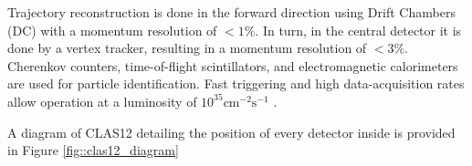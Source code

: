     Trajectory reconstruction is done in the forward direction using Drift Chambers (DC) with a momentum resolution of $< 1\%$.
    In turn, in the central detector it is done by a vertex tracker, resulting in a momentum resolution of $< 3\%$.
    Cherenkov counters, time-of-flight scintillators, and electromagnetic calorimeters are used for particle identification.
    Fast triggering and high data-acquisition rates allow operation at a luminosity of $10^{35} \text{cm}^{-2}\text{s}^{-1}$ \cite{burkert2020}.

    A diagram of CLAS12 detailing the position of every detector inside is provided in Figure \ref{fig::clas12_diagram}

    
    
    
